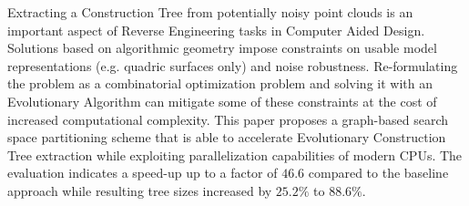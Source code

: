 Extracting a Construction Tree from potentially noisy point clouds is an important aspect of Reverse Engineering tasks in Computer Aided Design. 
Solutions based on algorithmic geometry impose constraints on usable model representations (e.g. quadric surfaces only) and noise robustness. 
Re-formulating the problem as a combinatorial optimization problem and solving it with an Evolutionary Algorithm can mitigate some of these constraints at the cost of increased computational complexity. 
This paper proposes a graph-based search space partitioning scheme that is able to accelerate Evolutionary Construction Tree extraction while exploiting parallelization capabilities of modern CPUs.
The evaluation indicates a speed-up up to a factor of $46.6$ compared to the baseline approach while resulting tree sizes increased by $25.2\%$ to $88.6\%$. 
